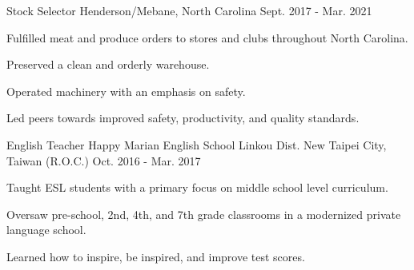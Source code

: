 \begin{cventries}
	\cventry
	{Stock Selector} %
	{} %
	{Henderson/Mebane, North Carolina} %
	{Sept. 2017 - Mar. 2021} %
	{
		\begin{cvitems} %
			\item {Fulfilled meat and produce orders to stores and clubs throughout North Carolina. }
			\item {Preserved a clean and orderly warehouse.}
			\item {Operated machinery with an emphasis on safety.}
			\item {Led peers towards improved safety, productivity, and quality standards.}
		\end{cvitems}
	}


	\cventry
	{English Teacher} %
	{Happy Marian English School} %
	{Linkou Dist. New Taipei City, Taiwan (R.O.C.)} %
	{Oct. 2016 - Mar. 2017} %
	{
		\begin{cvitems} %
			\item {Taught ESL students with a primary focus on middle school level curriculum.}
			\item {Oversaw pre-school, 2nd, 4th, and 7th grade classrooms in a modernized private language school.}
			\item {Learned how to inspire, be inspired, and improve test scores.}
		\end{cvitems}
	}
	

	
\end{cventries}